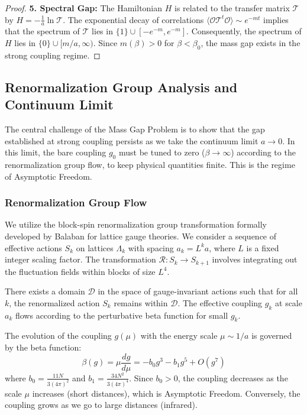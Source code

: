 \begin{proof}
\textbf{5. Spectral Gap:}
The Hamiltonian $H$ is related to the transfer matrix $\mathcal{T}$ by $H = -\frac{1}{a} \ln \mathcal{T}$. The exponential decay of correlations $\langle \mathcal{O} \mathcal{T}^t \mathcal{O} \rangle \sim e^{-mt}$ implies that the spectrum of $\mathcal{T}$ lies in $\{1\} \cup [-e^{-m}, e^{-m}]$. Consequently, the spectrum of $H$ lies in $\{0\} \cup [m/a, \infty)$. Since $m(\beta) > 0$ for $\beta < \beta_0$, the mass gap exists in the strong coupling regime.
\end{proof}

\subsection{Renormalization Group Analysis and Continuum Limit}

The central challenge of the Mass Gap Problem is to show that the gap established at strong coupling persists as we take the continuum limit $a \to 0$. In this limit, the bare coupling $g_0$ must be tuned to zero ($\beta \to \infty$) according to the renormalization group flow, to keep physical quantities finite. This is the regime of Asymptotic Freedom.

\subsubsection{Renormalization Group Flow}
We utilize the block-spin renormalization group transformation formally developed by Balaban for lattice gauge theories. We consider a sequence of effective actions $S_k$ on lattices $\Lambda_k$ with spacing $a_k = L^k a$, where $L$ is a fixed integer scaling factor.
The transformation $\mathcal{R}: S_k \to S_{k+1}$ involves integrating out the fluctuation fields within blocks of size $L^4$.

\begin{lemma}
There exists a domain $\mathcal{D}$ in the space of gauge-invariant actions such that for all $k$, the renormalized action $S_k$ remains within $\mathcal{D}$. The effective coupling $g_k$ at scale $a_k$ flows according to the perturbative beta function for small $g_k$.
\end{lemma}

The evolution of the coupling $g(\mu)$ with the energy scale $\mu \sim 1/a$ is governed by the beta function:
\begin{equation}
\beta(g) = \mu \frac{dg}{d\mu} = -b_0 g^3 - b_1 g^5 + O(g^7)
\label{eq:dbg-rg-beta-function}
\end{equation}
where $b_0 = \frac{11N}{3(4\pi)^2}$ and $b_1 = \frac{34N^2}{3(4\pi)^4}$. Since $b_0 > 0$, the coupling decreases as the scale $\mu$ increases (short distances), which is Asymptotic Freedom. Conversely, the coupling grows as we go to large distances (infrared).

